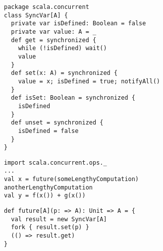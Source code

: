 \begin{itemize}
\begin{lstlisting}
package scala.concurrent
class SyncVar[A] {
  private var isDefined: Boolean = false
  private var value: A = _
  def get = synchronized {
    while (!isDefined) wait()
    value
  }
  def set(x: A) = synchronized {
    value = x; isDefined = true; notifyAll()
  }
  def isSet: Boolean = synchronized {
    isDefined
  }
  def unset = synchronized {
    isDefined = false
  }
}
\end{lstlisting}



\begin{lstlisting}
import scala.concurrent.ops._
...
val x = future(someLengthyComputation)
anotherLengthyComputation
val y = f(x()) + g(x())
\end{lstlisting}

\begin{lstlisting}
def future[A](p: => A): Unit => A = {
  val result = new SyncVar[A]
  fork { result.set(p) }
  (() => result.get)
}
\end{lstlisting}



\end{itemize}
